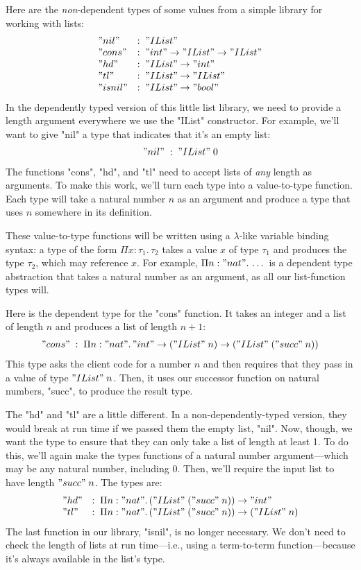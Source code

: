 Here are the \emph{non}-dependent types of some values from a simple library
for working with lists:
%
\[
\begin{array}{ll}
"nil" &:\; "IList" \\
"cons" &:\; "int" \to "IList" \to "IList" \\
"hd" &:\; "IList" \to "int" \\
"tl" &:\; "IList" \to "IList" \\
"isnil" &:\; "IList" \to "bool"
\end{array}
\]
%
In the dependently typed version of this little list library, we need to
provide a length argument everywhere we use the "IList" constructor.
For example, we'll want to give "nil" a type that indicates that it's an empty
list:
%
\[
\begin{array}{l}
"nil" \;:\; "IList" \; 0
\end{array}
\]
%
The functions "cons", "hd", and "tl" need to accept lists of \emph{any}
length as arguments.
To make this work, we'll turn each type into a value-to-type function.
Each type will take a natural number $n$ as an argument and produce a type
that uses $n$ somewhere in its definition.

These value-to-type functions will be written using a $\lambda$-like variable
binding syntax: a type of the form $\Pi x : \tau_1. \, \tau_2$ takes a value
$x$ of type $\tau_1$ and produces the type $\tau_2$, which may reference $x$.
For example, $\Pi n : "nat". \, \dots$ is a dependent type abstraction that
takes a natural number as an argument, as all our list-function types will.

Here is the dependent type for the "cons" function.
It takes an integer and a list of length $n$ and produces a list of length
$n+1$:
%
\[
\begin{array}{l}
"cons" \;:\; \Pi n : "nat". \,
"int" \to
("IList" \; n) \to
("IList" \; ("succ" \; n))
\end{array}
\]
%
This type asks the client code for a number $n$ and then requires that they
pass in a value of type $"IList" \; n$.
Then, it uses our successor function on natural numbers, "succ", to produce
the result type.

The "hd" and "tl" are a little different.
In a non-dependently-typed version, they would break at run time if we passed
them the empty list, "nil".
Now, though, we want the type to ensure that they can only take a list of
length at least 1.
To do this, we'll again make the types functions of a natural number
argument---which may be any natural number, including 0.
Then, we'll require the input list to have length $"succ" \; n$.
The types are:
%
\[
\begin{array}{ll}
"hd" &:\; \Pi n : "nat". \,
("IList" \; ("succ" \; n)) \to "int" \\
"tl" &:\; \Pi n : "nat". \,
("IList" \; ("succ" \; n)) \to ("IList" \; n)
\end{array}
\]
%
The last function in our library, "isnil", is no longer necessary.
We don't need to check the length of lists at run time---i.e., using a
term-to-term function---because it's always available in the list's type.


